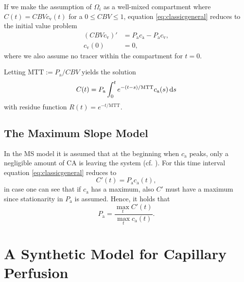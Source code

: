 \documentclass[paper=a4, fontsize=11pt,parskip=half,headings=small]{scrartcl}
\newcommand{\ca}{c_\mathrm{a}}
\newcommand{\MTT}{\mathrm{MTT}}
\newcommand{\cout}{c_{\mathrm{v}}}
\newcommand{\Pa}{P_{\mathrm{a}}}
\begin{document}
	If we make the assumption of $\Omega_i$ as a well-mixed compartment where $C(t) = CBV\cout(t)$ for a $0 \le CBV \le 1$, equation \eqref{eq:classicgeneral} reduces to the initial value problem
	\begin{align*}
		(CBV \cout)' &= \Pa \ca - \Pa \cout, \\
		\cout(0)&=0,
	\end{align*}
	where we also assume no tracer within the compartment for $t = 0$. 
	
	Letting $\MTT:=\Pa/CBV$ yields the solution
	\begin{equation}
		C(t) = \Pa \int_0^t e^{-(t-s)/\MTT}\ca(s)\diffint s
		\label{eq:classicalperf}
	\end{equation}
	with residue function $R(t)=e^{-t/\MTT}$. 

	
	
	
	\subsection{The Maximum Slope Model}\label{sec:ms}	
	In the MS model it is assumed that at the beginning when $\ca$ peaks, only a negligible amount of CA is leaving the system (cf. \cite{klotz99}).
	For this time interval equation \eqref{eq:classicgeneral} reduces to 
	\begin{equation}
		C'(t) = \Pa\ca(t),
	\end{equation}
	in case one can see that if $\ca$ has a maximum, also $C'$ must have a maximum since stationarity in $\Pa$ is assumed.
	Hence, it holds that
	\begin{equation}\label{eq:MS}
		\Pa = \frac{\max_{t}C'(t)}{\max_{t}\ca(t)}.
	\end{equation}
	
	
	
	\section{A Synthetic Model for Capillary Perfusion}\label{sec:synthetic}
	
\end{document}
